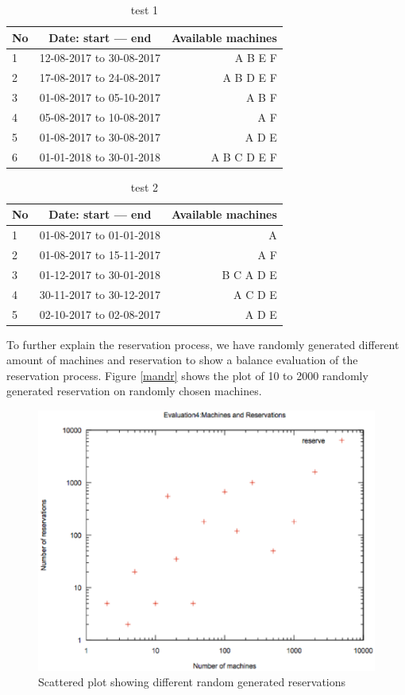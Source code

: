 \begin{table}[h!]
  \centering
  \label{tab:table1}
  \begin{tabular}{l|c||r}
    No & Date: start --- end & Available machines\\
    \hline
    1 &12-08-2017 to 30-08-2017  & A B E F \\
    2 &17-08-2017 to 24-08-2017  & A B D E F\\
    3 &01-08-2017 to 05-10-2017  & A B F \\
    4 &05-08-2017 to 10-08-2017  & A F \\
    5 &01-08-2017 to 30-08-2017  & A D E  \\
    6 &01-01-2018 to 30-01-2018  & A B C D E F \\
  \end{tabular}
  \caption{test 1}
\end{table}

\begin{table}[h!]
  \centering
  \label{tab:table1}
  \begin{tabular}{l|c||r}
    No & Date: start --- end & Available machines\\
    \hline
    1 &01-08-2017 to 01-01-2018  & A \\
    2 &01-08-2017 to 15-11-2017  & A F\\
    3 &01-12-2017 to 30-01-2018  & B C A D E \\
    4 &30-11-2017 to 30-12-2017  & A  C D E\\
    5 &02-10-2017 to 02-08-2017  & A  D E \\
  \end{tabular}
  \caption{test 2}
\end{table}
\pagebreak
To further explain the reservation process, we have randomly generated different amount of machines and reservation to show a balance evaluation of the reservation process. Figure \autoref{mandr} shows the plot of 10 to 2000 randomly generated reservation on randomly chosen machines.
\begin{figure}
\includegraphics[width=\linewidth]{mandr.eps}
\caption{Scattered plot showing different random generated reservations}
\label{mandr}
\end{figure}

